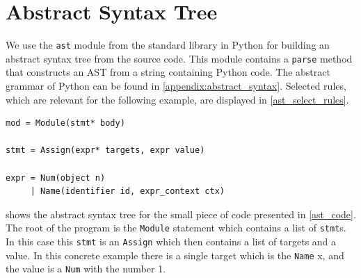 \section{Abstract Syntax Tree}\label{library:ast}
We use the \texttt{ast} module from the standard library in Python for building an abstract syntax tree from the source code.
This module contains a \texttt{parse} method that constructs an AST from a string containing Python code.
The abstract grammar of Python can be found in \cref{appendix:abstract_syntax}.
Selected rules, which are relevant for the following example, are displayed in \cref{ast_select_rules}.

\begin{lstlisting}[style=default, caption={Selected rules from the Python abstract grammar}, label={ast_select_rules}]
mod = Module(stmt* body)

stmt = Assign(expr* targets, expr value)

expr = Num(object n)
     | Name(identifier id, expr_context ctx)
\end{lstlisting}

 shows the abstract syntax tree for the small piece of code presented in \cref{ast_code}.
The root of the program is the \texttt{Module} statement which contains a list of \texttt{stmt}s.
In this case this \texttt{stmt} is an \texttt{Assign} which then contains a list of targets and a value.
In this concrete example there is a single target which is the \texttt{Name} x, and the value is a \texttt{Num} with the number 1.

